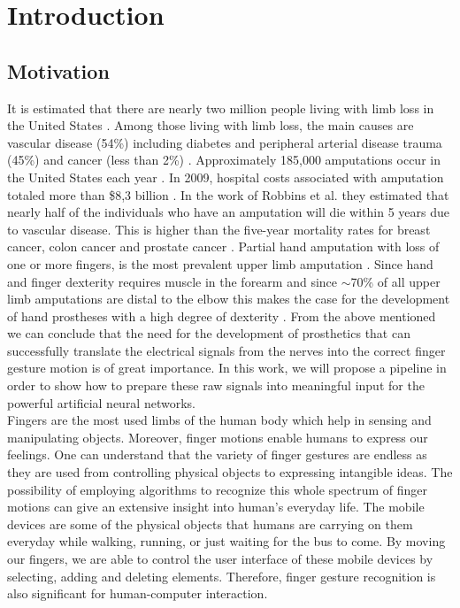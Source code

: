 \chapter{Introduction}
\section{Motivation}
It is estimated that there are nearly two million people living with limb loss in the United States \cite{ziegler-graham_estimating_2008}. Among those living with limb loss, the main causes are vascular disease (54\%) including diabetes and peripheral arterial disease trauma (45\%) and cancer (less than 2\%) \cite{ziegler-graham_estimating_2008}. Approximately 185,000 amputations occur in the United States each year \cite{owings_ambulatory_1998}. In 2009, hospital costs associated with amputation totaled more than \$8,3 billion \cite{varma_physical_2014}. In the work of Robbins et al. they estimated that nearly half of the individuals who have an amputation  will die within 5 years due to vascular disease. This is higher than the five-year mortality rates for breast cancer, colon cancer and prostate cancer \cite{robbins_mortality_2008}. Partial hand amputation with loss of one or more fingers, is the most prevalent upper limb amputation \cite{tenore_towards_2007}. Since hand and finger dexterity requires muscle in the forearm and since $\sim$70\% of all upper limb  amputations are distal to the elbow this makes the case for the development of hand prostheses with a high degree of dexterity \cite{dillingham_limb_2002,weir_persons_2000}. From the above mentioned we can conclude that the need for the development of prosthetics that can successfully translate the electrical signals from the nerves into the correct finger gesture motion is of great importance. In this work, we will propose a pipeline in order to show how to prepare these raw signals into meaningful input for the powerful artificial neural networks. \\  
Fingers are the most used limbs of the human body which help in sensing and manipulating objects. Moreover, finger motions enable humans to express our feelings. One can understand that the variety of finger gestures are endless as they are used from controlling physical objects to expressing intangible ideas. The possibility of employing algorithms to recognize this whole spectrum of finger motions can give an extensive insight into human's everyday life. The mobile devices are some of the physical objects that humans are carrying on them everyday while walking, running, or just waiting for the bus to come. By moving our fingers, we are able to control the user interface of these mobile devices by selecting, adding and deleting elements. Therefore, finger gesture recognition is also significant for human-computer interaction. \\
